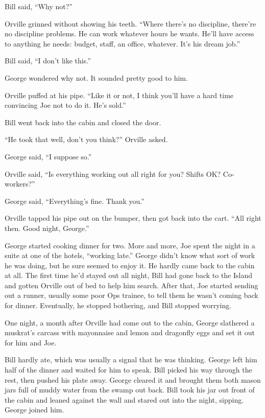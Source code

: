 Bill said, ``Why not?''

Orville grinned without showing his teeth.
``Where there's no discipline, there're no discipline problems. He can work 
whatever hours he wants. He'll have access to anything he needs: budget, staff, 
an office, whatever. It's his dream job.''

Bill said, ``I don't like this.''

George wondered why not. It sounded pretty good to him.

Orville puffed at his pipe.
``Like it or not, I think you'll have a hard time convincing Joe not to do it. 
He's sold.''

Bill went back into the cabin and closed the door.

``He took that well, don't you think?'' Orville asked.

George said, ``I suppose so.''

Orville said,
``Is everything working out all right for you? Shifts OK? Co-workers?''

George said, ``Everything's fine. Thank you.''

Orville tapped his pipe out on the bumper, then got back into the
cart. ``All right then. Good night, George.''

\tb

George started cooking dinner for two. More and more, Joe spent the
night in a suite at one of the hotels, ``working late.'' George
didn't know what sort of work he was doing, but he sure seemed to
enjoy it. He hardly came back to the cabin at all. The first time
he'd stayed out all night, Bill had gone back to the Island and
gotten Orville out of bed to help him search. After that, Joe
started sending out a runner, usually some poor Ops trainee, to
tell them he wasn't coming back for dinner. Eventually, he stopped
bothering, and Bill stopped worrying.

One night, a month after Orville had come out to the cabin, George
slathered a muskrat's carcass with mayonnaise and lemon and
dragonfly eggs and set it out for him and Joe.

Bill hardly ate, which was usually a signal that he was thinking.
George left him half of the dinner and waited for him to speak.
Bill picked his way through the rest, then pushed his plate away.
George cleared it and brought them both mason jars full of muddy
water from the swamp out back. Bill took his jar out front of the
cabin and leaned against the wall and stared out into the night,
sipping. George joined him.

